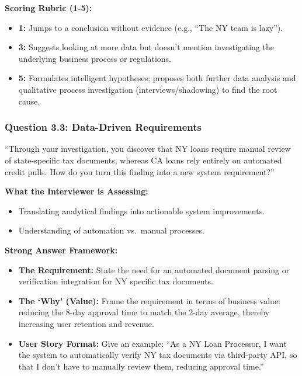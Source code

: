\textbf{Scoring Rubric (1-5):}

\begin{itemize}
\tightlist
\item
  \textbf{1:} Jumps to a conclusion without evidence (e.g., ``The NY
  team is lazy'').
\item
  \textbf{3:} Suggests looking at more data but doesn't mention
  investigating the underlying business process or regulations.
\item
  \textbf{5:} Formulates intelligent hypotheses; proposes both further
  data analysis and qualitative process investigation
  (interviews/shadowing) to find the root cause.
\end{itemize}

\subsubsection{Question 3.3: Data-Driven
Requirements}\label{question-3.3-data-driven-requirements}

``Through your investigation, you discover that NY loans require manual
review of state-specific tax documents, whereas CA loans rely entirely
on automated credit pulls. How do you turn this finding into a new
system requirement?''

\textbf{What the Interviewer is Assessing:}

\begin{itemize}
\tightlist
\item
  Translating analytical findings into actionable system improvements.
\item
  Understanding of automation vs.~manual processes.
\end{itemize}

\textbf{Strong Answer Framework:}

\begin{itemize}
\tightlist
\item
  \textbf{The Requirement:} State the need for an automated document
  parsing or verification integration for NY specific tax documents.
\item
  \textbf{The `Why' (Value):} Frame the requirement in terms of business
  value: reducing the 8-day approval time to match the 2-day average,
  thereby increasing user retention and revenue.
\item
  \textbf{User Story Format:} Give an example: ``As a NY Loan Processor,
  I want the system to automatically verify NY tax documents via
  third-party API, so that I don't have to manually review them,
  reducing approval time.''
\end{itemize}

